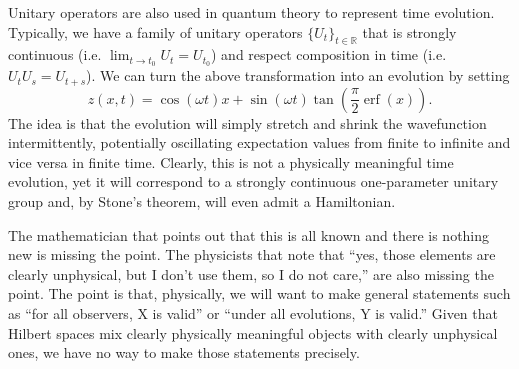 \documentclass[10pt,twocolumn, nofootinbib]{revtex4-2}
\DeclareMathOperator{\erf}{erf}
\begin{document}
Unitary operators are also used in quantum theory to represent time evolution. Typically, we have a family of unitary operators $\{U_t\}_{t \in \mathbb{R}}$ that is strongly continuous (i.e. $\lim_{t \to t_0} U_t = U_{t_0}$) and respect composition in time (i.e. $U_t U_s = U_{t+s}$). We can turn the above transformation into an evolution by setting
\begin{equation}
z(x, t) = \cos(\omega t) x + \sin(\omega t) \tan \left(\frac{\pi}{2}\erf(x)\right).
\end{equation}
The idea is that the evolution will simply stretch and shrink the wavefunction intermittently, potentially oscillating expectation values from finite to infinite and vice versa in finite time. Clearly, this is not a physically meaningful time evolution, yet it will correspond to a strongly continuous one-parameter unitary group and, by Stone's theorem, will even admit a Hamiltonian.

The mathematician that points out that this is all known and there is nothing new is missing the point. The physicists that note that ``yes, those elements are clearly unphysical, but I don't use them, so I do not care,'' are also missing the point. The point is that, physically, we will want to make general statements such as ``for all observers, X is valid'' or ``under all evolutions, Y is valid.'' Given that Hilbert spaces mix clearly physically meaningful objects with clearly unphysical ones, we have no way to make those statements precisely.
\end{document}
